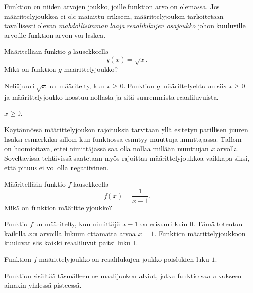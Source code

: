 
Funktion  on niiden arvojen joukko, joille funktion arvo on olemassa. Jos määrittelyjoukkoa ei ole mainittu erikseen, määrittelyjoukon tarkoitetaan tavallisesti olevan \textit{mahdollisimman laaja reaalilukujen osajoukko} johon kuuluville arvoille funktion arvon voi laskea. %

\begin{esimerkki}
	 Määritellään funktio $g$ lausekkeella \[ g(x) = \sqrt{x}. \]
	 Mikä on funktion $g$ määrittelyjoukko?
	 \begin{esimratk}
		Neliöjuuri $\sqrt{x}$ on määritelty, kun $x\geq{0}$. Funktion $g$ määrittelyehto on siis $x\geq{0}$ ja määrittelyjoukko koostuu nollasta ja sitä suuremmista reaaliluvuista.
	 \end{esimratk}
	 \begin{esimvast}
	  $x\geq{0}$.
	 \end{esimvast}
\end{esimerkki}

Käytännössä määrittelyjoukon rajoituksia tarvitaan yllä esitetyn parillisen juuren lisäksi esimerkiksi silloin kun funktiossa esiintyy muuttuja nimittäjässä. Tällöin on huomioitava, ettei nimittäjässä saa olla nollaa millään muuttujan $x$ arvolla. Soveltavissa tehtävissä saatetaan myös rajoittaa määrittelyjoukkoa vaikkapa siksi, että pituus ei voi olla negatiivinen.

\begin{esimerkki}
	Määritellään funktio $f$ lausekkeella \[ f(x) = \frac{1}{x-1}. \]
	Mikä on funktion määrittelyjoukko?
	\begin{esimratk}
	Funktio $f$ on määritelty, kun nimittäjä $x-1$ on erisuuri kuin $0$. Tämä toteutuu kaikilla $x$:n arvoilla lukuun ottamatta arvoa $x = 1$. Funktion määrittelyjoukkoon kuuluvat siis kaikki reaaliluvut paitsi luku $1$.
	\end{esimratk}
	\begin{esimvast}
		Funktion $f$ määrittelyjoukko on reaalilukujen joukko poislukien luku $1$.
	\end{esimvast}
\end{esimerkki}


Funktion  sisältää täsmälleen ne maalijoukon alkiot,
jotka funktio saa arvokseen ainakin yhdessä pisteessä.

